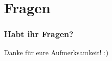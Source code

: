 \section*{Fragen}

\begin{frame}
    \frametitle{Habt ihr Fragen?}
    \center
    \Large
    Danke für eure Aufmerksamkeit! :)
\end{frame}
